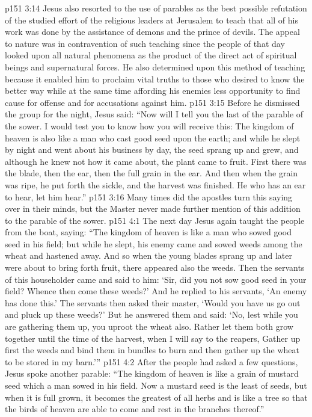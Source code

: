 \vs p151 3:14 Jesus also resorted to the use of parables as the best possible refutation of the studied effort of the religious leaders at Jerusalem to teach that all of his work was done by the assistance of demons and the prince of devils. The appeal to nature was in contravention of such teaching since the people of that day looked upon all natural phenomena as the product of the direct act of spiritual beings and supernatural forces. He also determined upon this method of teaching because it enabled him to proclaim vital truths to those who desired to know the better way while at the same time affording his enemies less opportunity to find cause for offense and for accusations against him.
\vs p151 3:15 Before he dismissed the group for the night, Jesus said: \textcolor{ubdarkred}{“Now will I tell you the last of the parable of the sower. I would test you to know how you will receive this: The kingdom of heaven is also like a man who cast good seed upon the earth; and while he slept by night and went about his business by day, the seed sprang up and grew, and although he knew not how it came about, the plant came to fruit. First there was the blade, then the ear, then the full grain in the ear. And then when the grain was ripe, he put forth the sickle, and the harvest was finished. He who has an ear to hear, let him hear.”}
\vs p151 3:16 Many times did the apostles turn this saying over in their minds, but the Master never made further mention of this addition to the parable of the sower.
\vs p151 4:1 The next day Jesus again taught the people from the boat, saying: \textcolor{ubdarkred}{“The kingdom of heaven is like a man who sowed good seed in his field; but while he slept, his enemy came and sowed weeds among the wheat and hastened away. And so when the young blades sprang up and later were about to bring forth fruit, there appeared also the weeds. Then the servants of this householder came and said to him: ‘Sir, did you not sow good seed in your field? Whence then come these weeds?’ And he replied to his servants, ‘An enemy has done this.’ The servants then asked their master, ‘Would you have us go out and pluck up these weeds?’ But he answered them and said: ‘No, lest while you are gathering them up, you uproot the wheat also. Rather let them both grow together until the time of the harvest, when I will say to the reapers, Gather up first the weeds and bind them in bundles to burn and then gather up the wheat to be stored in my barn.’”}
\pc \vs p151 4:2 After the people had asked a few questions, Jesus spoke another parable: \textcolor{ubdarkred}{“The kingdom of heaven is like a grain of mustard seed which a man sowed in his field. Now a mustard seed is the least of seeds, but when it is full grown, it becomes the greatest of all herbs and is like a tree so that the birds of heaven are able to come and rest in the branches thereof.”}
